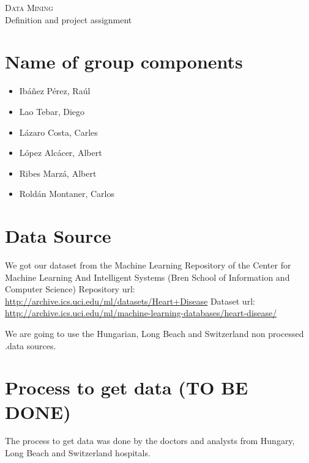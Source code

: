 \documentclass[a4paper,12pt]{article}
\begin{document}
\begin{center}
    \huge{\textsc{Data Mining} \\ Definition and project assignment}
\end{center}


%

\section{Name of group components}

    \begin{itemize}
    
        \item Ibáñez Pérez, Raúl
        \item Lao Tebar, Diego
        \item Lázaro Costa, Carles
        \item López Alcácer, Albert
        \item Ribes Marzá, Albert
        \item Roldán Montaner, Carlos

    \end{itemize}

\section{Data Source}

    We got our dataset from the Machine Learning Repository of the Center for Machine Learning And Intelligent Systems (Bren School of Information and Computer Science)\newline
    Repository url: \url{http://archive.ics.uci.edu/ml/datasets/Heart+Disease}\newline
    Dataset url: \url{http://archive.ics.uci.edu/ml/machine-learning-databases/heart-disease/} \newline

    We are going to use the Hungarian, Long Beach and Switzerland non processed .data sources.

\section{Process to get data (\textbf{TO BE DONE})}
    The process to get data was done by the doctors and analysts from Hungary, Long Beach and Switzerland hospitals.
    
\end{document}
